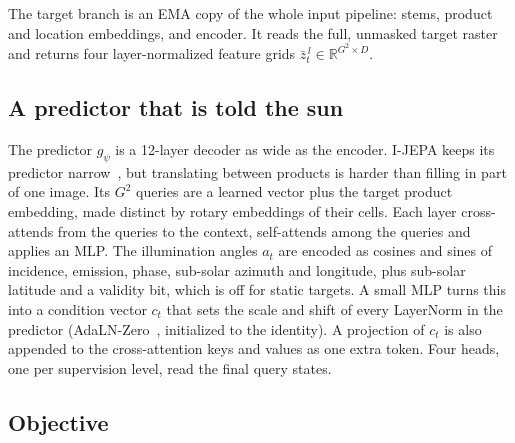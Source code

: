 The target branch is an EMA copy of the whole input pipeline: stems, product and location embeddings, and encoder. It reads the full, unmasked target raster and returns four layer-normalized feature grids $\bar z^{\,l}_t \in \mathbb{R}^{G^2\times D}$.

\subsection{A predictor that is told the sun}
\label{sec:predictor}

The predictor $g_\psi$ is a 12-layer decoder as wide as the encoder. I-JEPA keeps its predictor narrow~\cite{assran2023self}, but translating between products is harder than filling in part of one image. Its $G^2$ queries are a learned vector plus the target product embedding, made distinct by rotary embeddings of their cells. Each layer cross-attends from the queries to the context, self-attends among the queries and applies an MLP. The illumination angles $a_t$ are encoded as cosines and sines of incidence, emission, phase, sub-solar azimuth and longitude, plus sub-solar latitude and a validity bit, which is off for static targets. A small MLP turns this into a condition vector $c_t$ that sets the scale and shift of every LayerNorm in the predictor (AdaLN-Zero~\cite{peebles2023scalable}, initialized to the identity). A projection of $c_t$ is also appended to the cross-attention keys and values as one extra token. Four heads, one per supervision level, read the final query states.

\subsection{Objective}
\label{sec:objective}


